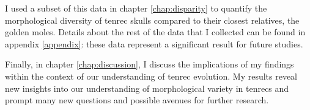 	I used a subset of this data in chapter \ref{chap:disparity} to quantify the morphological diversity of tenrec skulls compared to their closest relatives, the golden moles. Details about the rest of the data that I collected can be found in appendix \ref{appendix}: these data represent a significant result for future studies.

	
	Finally, in chapter \ref{chap:discussion}, I discuss the implications of my findings within the context of our understanding of tenrec evolution.%
 	My results reveal new insights into our understanding of morphological variety in tenrecs and prompt many new questions and possible avenues for further research.


